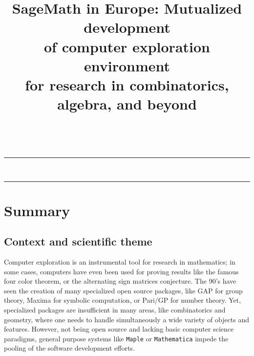 \documentclass[a4,12pt]{amsart}
\title[SageMath in Europe]{SageMath in Europe: Mutualized development\\
  of computer exploration environment\\
  for research in combinatorics, algebra, and beyond
}
\date{}
\newcommand{\sage}{\href{http://www.sagemath.org/}{\texttt{Sage}}\xspace}
\newcommand{\TODO}[2][To do: ]{{\textcolor{red}{\textbf{#1#2}}}}
\begin{document}
\ \vspace{-1.5cm}
\hrule
\medskip
\maketitle
\ \vspace{-1cm}
\hrule




\section{Summary}

\subsection{Context and scientific theme}

Computer exploration is an instrumental tool for research in
mathematics; in some cases, computers have even been used for proving
results like the famous four color theorem, or the alternating
sign matrices conjecture.
The 90's have seen the creation of many specialized open source
packages, like GAP for group theory, Maxima for symbolic computation,
or Pari/GP for number theory.  Yet, specialized packages are
insufficient in many areas, like combinatorics and geometry, where one
needs to handle simultaneously a wide variety of objects and features.
However, not being open source and lacking basic computer science
paradigms, general purpose systems like \texttt{Maple} or
\texttt{Mathematica} impede the pooling of the software development
efforts.
\end{document}
